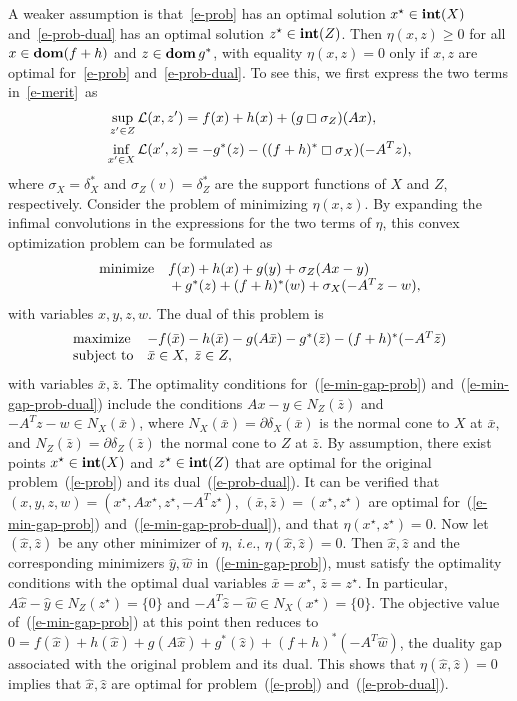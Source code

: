 \documentclass[letterpaper,11pt]{article}
\newcommand{\BEQ}{\begin{equation}}
\newcommand{\EEQ}{\end{equation}}
\newcommand{\ie}{{\it i.e.}}
\newcommand{\dom}{\mathop{\bf dom}}
\newcommand{\intr}{\mathop{\bf int}}
\newcommand{\cL}{\mathcal L}
\begin{document}
A weaker assumption is that~\eqref{e-prob}
has an optimal solution $x^\star \in \intr(X)$
and~\eqref{e-prob-dual} has an optimal solution $z^\star\in \intr(Z)$.
Then $\eta(x,z) \geq 0$
for all $x \in \dom(f+h)$ and $z \in \dom g^*$, with equality
$\eta(x,z) = 0$ only if $x,z$ are optimal for~\eqref{e-prob}
and~\eqref{e-prob-dual}.
To see this, we first express the two terms in~\eqref{e-merit}~as
\begin{align*}
\sup_{z'\in Z} \cL(x,z') &= f(x) + h(x) + (g \boxempty \sigma_Z) (Ax), \\
\inf_{x'\in X} \cL(x',z) &= -g^*(z) - ( (f+h)^* \boxempty \sigma_X)(-A^Tz),
\end{align*}
where $\sigma_X = \delta_X^*$ and $\sigma_Z(v) = \delta_Z^*$
are the support functions of $X$ and $Z$, respectively.
Consider the problem of minimizing $\eta(x,z)$.
By expanding the infimal convolutions in the expressions for the
two terms of $\eta$, this convex optimization problem can be formulated as
\BEQ \label{e-min-gap-prob}
\begin{array}{l@{\hskip 1em}l}
\mbox{minimize} &
f(x) + h(x) + g(y) + \sigma_Z(Ax-y) \\
& \mbox{} + g^*(z) + (f+h)^*(w) + \sigma_X(-A^Tz-w),
\end{array}
\EEQ
with variables $x, y, z, w$.
The dual of this problem is
\BEQ \label{e-min-gap-prob-dual}
\begin{array}{l@{\hskip 1em}l}
\mbox{maximize} & -f(\bar x) - h(\bar x) - g(A\bar x)
 -g^*(\bar z) - (f+h)^*(-A^T\bar z) \\
\mbox{subject to} & \bar x \in X, \; \bar z  \in Z,
\end{array}
\EEQ
with variables $\bar x, \bar z$.  The optimality conditions
for~(\ref{e-min-gap-prob}) and~(\ref{e-min-gap-prob-dual}) include the
conditions
$Ax-y \in N_Z(\bar z)$ and $-A^Tz - w \in N_X(\bar x)$,
where $N_X(\bar x) = \partial \delta_X(\bar x)$ is the normal cone
to $X$ at $\bar x$, and
$N_Z(\bar z) = \partial \delta_Z(\bar z)$ the normal cone
to $Z$ at $\bar z$.
By assumption, there exist points $x^\star \in \intr(X)$ and
$z^\star \in \intr(Z)$ that are optimal for the original
problem~(\ref{e-prob}) and  its dual~(\ref{e-prob-dual}).
It can be verified that
$(x,y,z,w) = (x^\star, Ax^\star, z^\star, -A^Tz^\star)$,
$(\bar x, \bar z) = (x^\star, z^\star)$
are optimal for~(\ref{e-min-gap-prob}) and~(\ref{e-min-gap-prob-dual}),
and that $\eta(x^\star,z^\star) = 0$.
Now let $(\hat x,\hat z)$ be any other minimizer of $\eta$, \ie,
$\eta(\hat x, \hat z) = 0$.
Then $\hat x, \hat z$ and the corresponding minimizers $\hat y, \hat w$
in~(\ref{e-min-gap-prob}), must satisfy the optimality conditions
with the optimal dual variables
$\bar x= x^\star$, $\bar z = z^\star$. In particular,
$A\hat x -\hat y \in N_Z(z^\star) = \{0\}$
and $-A^T\hat z -\hat w \in N_X(x^\star) = \{0\}$.
The objective value of~(\ref{e-min-gap-prob}) at this point then reduces
to $0 = f(\hat x) + h(\hat x) + g(A\hat x)
 + g^*(\hat z) + (f+h)^*(-A^T\hat w)$,  the duality gap associated
with the original problem and its dual.
This shows that $\eta(\hat x, \hat z) =0$ implies that $\hat x, \hat z$
are optimal for problem~(\ref{e-prob}) and~(\ref{e-prob-dual}).
\end{document}
